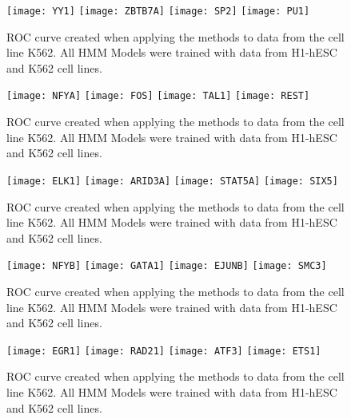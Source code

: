 \documentclass[11pt,a4]{article}
\begin{document}
\begin{figure}[h]
\centering
    \texttt{[image: YY1]}
    \texttt{[image: ZBTB7A]}
    \texttt{[image: SP2]}
    \texttt{[image: PU1]}
\caption{ROC curve created when applying the methods to data from the cell line K562. All HMM Models were trained with data from H1-hESC and K562 cell lines.}
\label{fig:roc.K562.1}
\end{figure}

\begin{figure}[h]
\centering
    \texttt{[image: NFYA]}
    \texttt{[image: FOS]}
    \texttt{[image: TAL1]}
    \texttt{[image: REST]}
\caption{ROC curve created when applying the methods to data from the cell line K562. All HMM Models were trained with data from H1-hESC and K562 cell lines.}
\label{fig:roc.K562.2}
\end{figure}

\begin{figure}[h]
\centering
    \texttt{[image: ELK1]}
    \texttt{[image: ARID3A]}
    \texttt{[image: STAT5A]}
    \texttt{[image: SIX5]}
\caption{ROC curve created when applying the methods to data from the cell line K562. All HMM Models were trained with data from H1-hESC and K562 cell lines.}
\label{fig:roc.K562.3}
\end{figure}

\begin{figure}[h]
\centering
    \texttt{[image: NFYB]}
    \texttt{[image: GATA1]}
    \texttt{[image: EJUNB]}
    \texttt{[image: SMC3]}
\caption{ROC curve created when applying the methods to data from the cell line K562. All HMM Models were trained with data from H1-hESC and K562 cell lines.}
\label{fig:roc.K562.4}
\end{figure}

\begin{figure}[h]
\centering
    \texttt{[image: EGR1]}
    \texttt{[image: RAD21]}
    \texttt{[image: ATF3]}
    \texttt{[image: ETS1]}
\caption{ROC curve created when applying the methods to data from the cell line K562. All HMM Models were trained with data from H1-hESC and K562 cell lines.}
\label{fig:roc.K562.5}
\end{figure}
\end{document}

